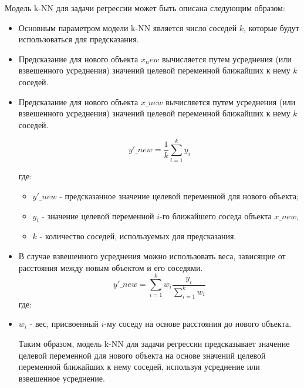 Модель k-NN для задачи регрессии может быть описана следующим образом:
\begin{itemize}
    \item Основным параметром модели k-NN является число соседей $k$, которые будут использоваться для предсказания.
    \item Предсказание для нового объекта $x_new$ вычисляется путем усреднения (или взвешенного усреднения) значений целевой переменной ближайших к нему $k$ соседей.
    \item Предсказание для нового объекта $x\_new$ вычисляется путем усреднения (или взвешенного усреднения) значений целевой переменной ближайших к нему $k$ соседей.
    
    \begin{equation}
        y'\_new = \frac{1}{k}\sum_{i=1}^k y_{i}
    \end{equation}
        
    где:
    \begin{itemize}
        \item   $y'\_new$ - предсказанное значение целевой переменной для нового объекта;
        \item $y_{i}$ - значение целевой переменной $i$-го ближайшего соседа объекта $x\_new$,
        \item $k$ - количество соседей, используемых для предсказания.
    \end{itemize}
    \item В случае взвешенного усреднения можно использовать веса, зависящие от расстояния между новым объектом и его соседями.
    \begin{equation}
        y'\_new = \sum_{i=1}^k w_{i} \frac{y_{i}}{\sum_{i=1}^k w_{i}}
    \end{equation}
    где:
    \item $w_{i}$ - вес, присвоенный $i$-му соседу на основе расстояния до нового объекта.
    
    Таким образом, модель k-NN для задачи регрессии предсказывает значение целевой переменной для нового объекта на основе значений целевой переменной ближайших к нему соседей, используя усреднение или взвешенное усреднение.
\end{itemize}



